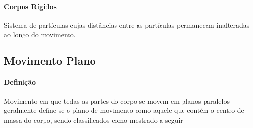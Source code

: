 \documentclass{article}
\begin{document}
        \paragraph{Corpos Rígidos}Sistema de partículas cujas distâncias entre as partículas permanecem inalteradas ao longo do movimento.

        \subsection{Movimento Plano}
            \paragraph{Definição}Movimento em que todas as partes do corpo se movem em planos paralelos geralmente define-se o plano de movimento como aquele que contém o centro de massa do corpo, sendo classificados como mostrado a seguir:
\end{document}
